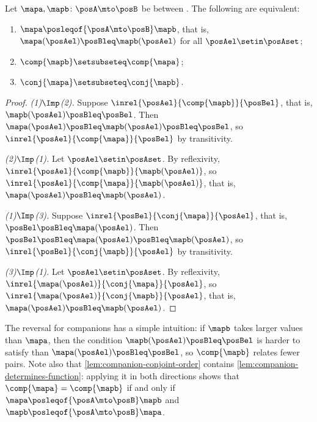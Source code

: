 \begin{lemma}
    \label{lem:companion-conjoint-order}
    Let $\mapa, \mapb \colon \posA \mto \posB$ be  between .
    The following are equivalent:
    \begin{enumerate}
        \item $\mapa \posleqof{\posA \mto \posB} \mapb$, that is, $\mapa(\posAel) \posBleq \mapb(\posAel)$ for all $\posAel \setin \posAset$;
        \item $\comp{\mapb} \setsubseteq \comp{\mapa}$;
        \item $\conj{\mapa} \setsubseteq \conj{\mapb}$.
    \end{enumerate}
\end{lemma}
\begin{proof}
    \emph{(1)$\Imp$(2).}
    Suppose $\inrel{\posAel}{\comp{\mapb}}{\posBel}$, that is, $\mapb(\posAel) \posBleq \posBel$.
    Then $\mapa(\posAel) \posBleq \mapb(\posAel) \posBleq \posBel$, so $\inrel{\posAel}{\comp{\mapa}}{\posBel}$ by transitivity.

    \emph{(2)$\Imp$(1).}
    Let $\posAel \setin \posAset$.
    By reflexivity, $\inrel{\posAel}{\comp{\mapb}}{\mapb(\posAel)}$, so $\inrel{\posAel}{\comp{\mapa}}{\mapb(\posAel)}$, that is, $\mapa(\posAel) \posBleq \mapb(\posAel)$.

    \emph{(1)$\Imp$(3).}
    Suppose $\inrel{\posBel}{\conj{\mapa}}{\posAel}$, that is, $\posBel \posBleq \mapa(\posAel)$.
    Then $\posBel \posBleq \mapa(\posAel) \posBleq \mapb(\posAel)$, so $\inrel{\posBel}{\conj{\mapb}}{\posAel}$ by transitivity.

    \emph{(3)$\Imp$(1).}
    Let $\posAel \setin \posAset$.
    By reflexivity, $\inrel{\mapa(\posAel)}{\conj{\mapa}}{\posAel}$, so $\inrel{\mapa(\posAel)}{\conj{\mapb}}{\posAel}$, that is, $\mapa(\posAel) \posBleq \mapb(\posAel)$.
\end{proof}

The reversal for companions has a simple intuition: if $\mapb$ takes larger values than $\mapa$, then the condition $\mapb(\posAel) \posBleq \posBel$ is harder to satisfy than $\mapa(\posAel) \posBleq \posBel$, so $\comp{\mapb}$ relates fewer pairs.
Note also that \cref{lem:companion-conjoint-order} contains \cref{lem:companion-determines-function}: applying it in both directions shows that $\comp{\mapa} = \comp{\mapb}$ if and only if $\mapa \posleqof{\posA \mto \posB} \mapb$ and $\mapb \posleqof{\posA \mto \posB} \mapa$.

